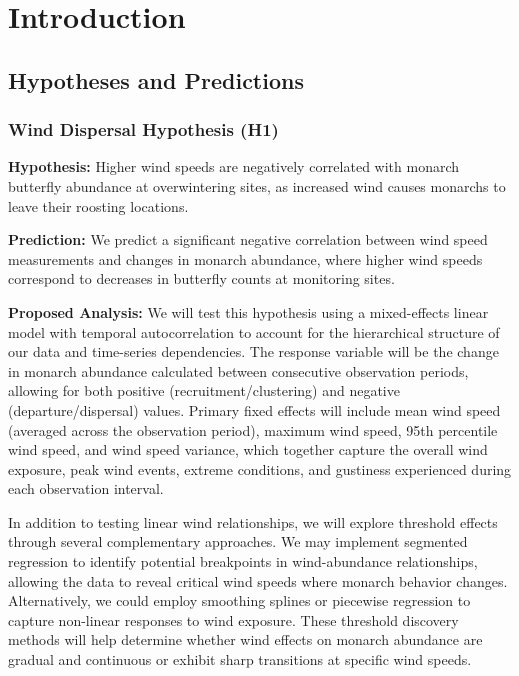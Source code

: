 \chapter{Introduction}
\label{ch:introduction}

\section{Hypotheses and Predictions}

\subsection{Wind Dispersal Hypothesis (H1)}

\textbf{Hypothesis:} Higher wind speeds are negatively correlated with monarch butterfly abundance at overwintering sites, as increased wind causes monarchs to leave their roosting locations.

\textbf{Prediction:} We predict a significant negative correlation between wind speed measurements and changes in monarch abundance, where higher wind speeds correspond to decreases in butterfly counts at monitoring sites.

\textbf{Proposed Analysis:}
We will test this hypothesis using a mixed-effects linear model with temporal autocorrelation to account for the hierarchical structure of our data and time-series dependencies. The response variable will be the change in monarch abundance calculated between consecutive observation periods, allowing for both positive (recruitment/clustering) and negative (departure/dispersal) values. Primary fixed effects will include mean wind speed (averaged across the observation period), maximum wind speed, 95th percentile wind speed, and wind speed variance, which together capture the overall wind exposure, peak wind events, extreme conditions, and gustiness experienced during each observation interval.

In addition to testing linear wind relationships, we will explore threshold effects through several complementary approaches. We may implement segmented regression to identify potential breakpoints in wind-abundance relationships, allowing the data to reveal critical wind speeds where monarch behavior changes. Alternatively, we could employ smoothing splines or piecewise regression to capture non-linear responses to wind exposure. These threshold discovery methods will help determine whether wind effects on monarch abundance are gradual and continuous or exhibit sharp transitions at specific wind speeds.

